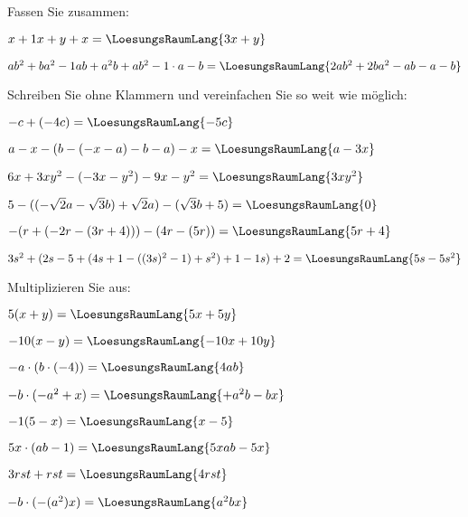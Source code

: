
\renewcommand{\bbwAufgabenBlockID}{A1G}

\renewcommand{\metaHeaderLine}{Aufgabenblatt}
\renewcommand{\arbeitsblattTitel}{Grundoperationen}


\arbeitsblattHeader{}
Fassen Sie zusammen:
\begin{bbwAufgabenBlock}
\item $x+1x+y+x = \LoesungsRaumLang{3x+y}$
\item $ab^2+ba^2 - 1ab + a^2b + ab^2 - 1\cdot{}a -b  = \LoesungsRaumLang{2ab^2 + 2ba^2 - ab - a - b}$
\end{bbwAufgabenBlock}

Schreiben Sie ohne Klammern und vereinfachen Sie so weit wie möglich:
\begin{bbwAufgabenBlock}
\item $-c+(-4c) = \LoesungsRaumLang{-5c}$
\item $a-x-(b-(-x-a)-b-a)-x = \LoesungsRaumLang{a-3x}$\newpage
\item $6x+3xy^2 -(-3x-y^2)-9x-y^2 = \LoesungsRaumLang{3xy^2}$
\item $5-((-\sqrt{2}a - \sqrt{3}b)+\sqrt{2}a)-(\sqrt{3}b+5)= \LoesungsRaumLang{0}$
\item $-(r+(-2r-(3r+4)))-(4r-(5r))=\LoesungsRaumLang{5r+4}$
\item $3s^2+(2s-5+(4s+1-((3s)^2-1)+s^2)+1-1s)+2 = \LoesungsRaumLang{5s-5s^2}$
\end{bbwAufgabenBlock}
\newpage


Multiplizieren Sie aus:

\begin{bbwAufgabenBlock}
\item $5(x+y)=\LoesungsRaumLang{5x+5y}$
\item $-10(x-y)=\LoesungsRaumLang{-10x+10y}$
\item $-a\cdot{}(b\cdot{}(-4)) = \LoesungsRaumLang{4ab}$
\item $-b\cdot{}(-a^2+x) = \LoesungsRaumLang{+a^2b - bx}$\newpage
\item $-1(5-x)=\LoesungsRaumLang{x-5}$
\item $5x\cdot{}(ab-1)=\LoesungsRaumLang{5xab - 5x}$
\item $3rst + rst=\LoesungsRaumLang{4rst}$
\item $-b\cdot{}(-(a^2)x) = \LoesungsRaumLang{a^2bx}$\newpage
\end{bbwAufgabenBlock}
\newpage

